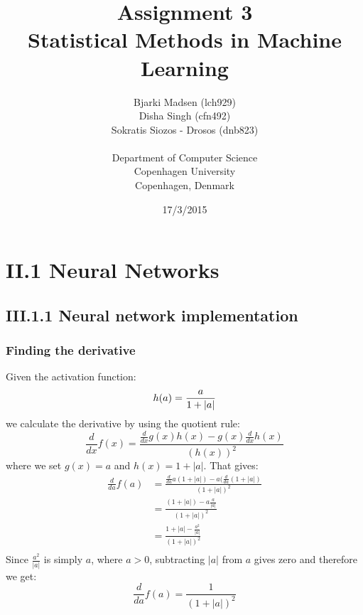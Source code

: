 \documentclass[12pt]{article}
\newcommand{\assignmentname}{Assignment 3}
\newcommand{\coursename}{Statistical Methods in Machine Learning}
\newcommand{\studentnameOne}{Bjarki Madsen (lch929)}
\newcommand{\studentnameTwo}{Disha Singh (cfn492)}
\newcommand{\studentnameThree}{Sokratis Siozos - Drosos (dnb823)}
\newcommand{\department}{Department of Computer Science}
\newcommand{\institution}{Copenhagen University}
\newcommand{\location}{Copenhagen, Denmark}
\begin{document}
\renewcommand\refname{References}

\title{\assignmentname \\ {\Large {\textsc \coursename}}}
\author{
        \studentnameOne \\
        \studentnameTwo \\
        \studentnameThree \\ \\
                \department \\
        \institution \\
        \location
}
\date{17/3/2015}

\maketitle
\thispagestyle{empty}

\pagebreak

\section*{II.1 Neural Networks}

  \subsection*{III.1.1 Neural network implementation}

    \subsubsection*{Finding the derivative}

      Given the activation function:
        $$h(a) = \frac{a}{1 + |a|} \\$$
      we calculate the derivative by using the quotient rule:
        $$\frac{d}{dx}f(x) = \frac{\frac{d}{dx}g(x)h(x) - g(x)\frac{d}{dx}h(x)}{(h(x))^2}$$
      where we set $g(x) = a$ and $h(x) = 1 + |a|$. That gives:
        \begin{align*}
          \frac{d}{da}f(a) &= \frac{\frac{d}{da}a(1+|a|) - a(\frac{d}{da}(1 + |a|)}{(1+|a|)^2} \\
          &= \frac{(1 + |a|) - a\frac{a}{|a|}}{(1+|a|)^2} \\
          &= \frac{1 + |a| - \frac{a^2}{|a|}}{(1+|a|)^2} \\
        \end{align*}
      Since $\frac{a^2}{|a|}$ is simply $a$, where $a > 0$, subtracting $|a|$ from $a$ gives zero and therefore we get:
        $$\frac{d}{da}f(a) = \frac{1}{(1+|a|)^2}$$
\end{document}
